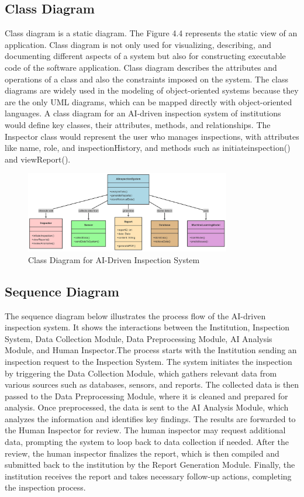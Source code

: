 \documentclass[12pt,a4paper]{report}
\begin{document}
\subsection{Class Diagram}
Class diagram is a static diagram. The Figure 4.4 represents the static view of an application. Class diagram is not only used for visualizing, describing, and documenting different aspects of a system but also for constructing executable code of the software application. Class diagram describes the attributes and operations of a class and also the constraints imposed on the system. The class diagrams are widely used in the modeling of object-oriented systems because they are the only UML diagrams, which can be mapped directly with object-oriented languages.
A class diagram for an AI-driven inspection system of institutions would define key classes, their attributes, methods, and relationships. The Inspector class would represent the user who manages inspections, with attributes like name, role, and inspectionHistory, and methods such as initiateinspection() and viewReport().
\begin{figure}[H]
    \centering
    \includegraphics[width=0.8\textwidth]{images/mermaid-ai-diagram-2025-04-27-113217.png}
    \caption{Class Diagram for AI-Driven Inspection System}
\end{figure}
\subsection{Sequence Diagram}
The sequence diagram below illustrates the process flow of the AI-driven inspection system. It shows the interactions between the Institution, Inspection System, Data Collection Module, Data Preprocessing Module, AI Analysis Module, and Human Inspector.The process starts with the Institution sending an inspection request to the Inspection System. The system initiates the inspection by triggering the Data Collection Module, which gathers relevant data from various sources such as databases, sensors, and reports. The collected data is then passed to the Data Preprocessing Module, where it is cleaned and prepared for analysis. Once preprocessed, the data is sent to the AI Analysis Module, which analyzes the information and identifies key findings. The results are forwarded to the Human Inspector for review. The human inspector may request additional data, prompting the system to loop back to data collection if needed. After the review, the human inspector finalizes the report, which is then compiled and submitted back to the institution by the Report Generation Module. Finally, the institution receives the report and takes necessary follow-up actions, completing the inspection process.
\end{document}
